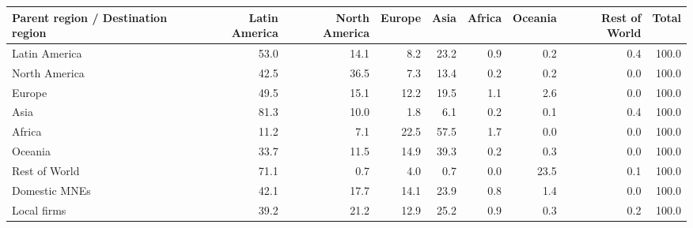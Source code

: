 \begin{tabular}{lrrrrrrrr}
\toprule
Parent region / Destination region & Latin America & North America & Europe & Asia & Africa & Oceania & Rest of World & Total \\
\midrule
Latin America & 53.0 & 14.1 & 8.2 & 23.2 & 0.9 & 0.2 & 0.4 & 100.0 \\
North America & 42.5 & 36.5 & 7.3 & 13.4 & 0.2 & 0.2 & 0.0 & 100.0 \\
Europe & 49.5 & 15.1 & 12.2 & 19.5 & 1.1 & 2.6 & 0.0 & 100.0 \\
Asia & 81.3 & 10.0 & 1.8 & 6.1 & 0.2 & 0.1 & 0.4 & 100.0 \\
Africa & 11.2 & 7.1 & 22.5 & 57.5 & 1.7 & 0.0 & 0.0 & 100.0 \\
Oceania & 33.7 & 11.5 & 14.9 & 39.3 & 0.2 & 0.3 & 0.0 & 100.0 \\
Rest of World & 71.1 & 0.7 & 4.0 & 0.7 & 0.0 & 23.5 & 0.1 & 100.0 \\
Domestic MNEs & 42.1 & 17.7 & 14.1 & 23.9 & 0.8 & 1.4 & 0.0 & 100.0 \\
Local firms & 39.2 & 21.2 & 12.9 & 25.2 & 0.9 & 0.3 & 0.2 & 100.0 \\
\bottomrule
\end{tabular}
